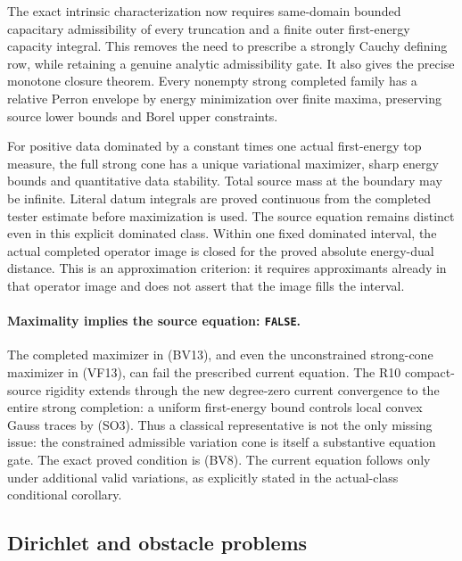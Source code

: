 The exact intrinsic characterization now requires same-domain
bounded capacitary admissibility of every truncation and a
finite outer first-energy capacity integral. This removes
the need to prescribe a strongly Cauchy defining row, while
retaining a genuine analytic admissibility gate. It also
gives the precise monotone closure theorem. Every nonempty
strong completed family has a relative Perron envelope by
energy minimization over finite maxima, preserving source
lower bounds and Borel upper constraints.

For positive data dominated by a constant times one actual
first-energy top measure, the full strong cone has a unique
variational maximizer, sharp energy bounds and quantitative
data stability. Total source mass at the boundary may be
infinite. Literal datum integrals are proved continuous from
the completed tester estimate before maximization is used.
The source equation remains distinct even in this explicit
dominated class.
Within one fixed dominated interval, the actual completed
operator image is closed for the proved absolute
energy-dual distance. This is an approximation criterion:
it requires approximants already in that operator image
and does not assert that the image fills the interval.

\paragraph{Maximality implies the source equation: \texttt{FALSE}.}
The completed maximizer in (BV13), and even the
unconstrained strong-cone maximizer in (VF13), can
fail the prescribed current equation.
The R10 compact-source rigidity extends through
the new degree-zero current convergence to the
entire strong completion: a uniform first-energy
bound controls local convex Gauss traces by (SO3).
Thus a classical representative is not
the only missing issue: the constrained
admissible variation cone is itself a
substantive equation gate.
The exact proved condition is (BV8).
The current equation follows only under
additional valid variations, as explicitly
stated in the actual-class conditional
corollary.

\subsection{Dirichlet and obstacle problems}

